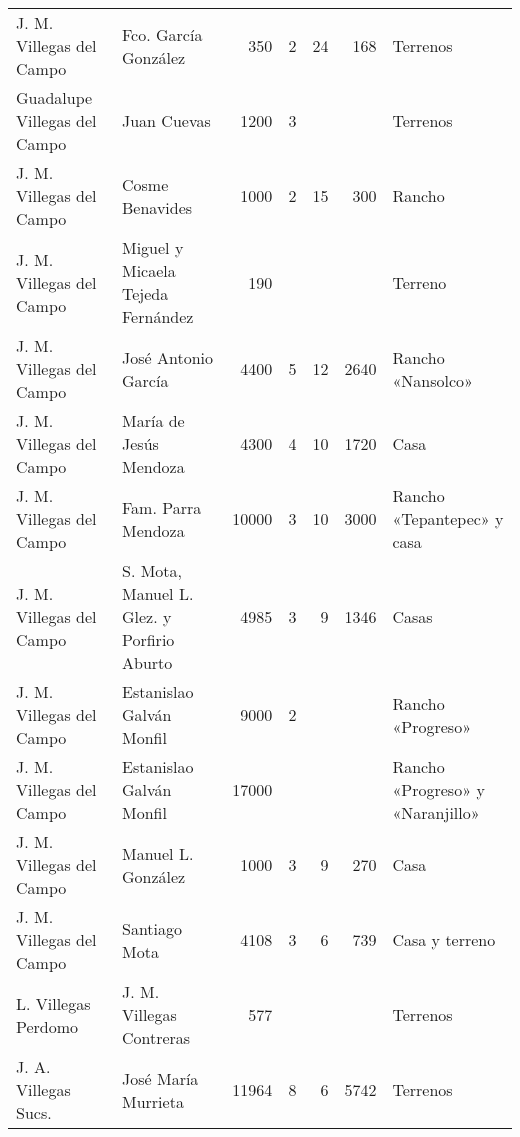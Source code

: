 \documentclass[14pt,twoside,final]{extbook} %
\begin{document}
{\begin{longtable}[c]{@{}p{2.5cm}lrSrrl@{}}
J. M. Villegas del Campo & Fco. García González & 350 & 2 & 24 & 168 & Terrenos \\
Guadalupe Villegas del Campo & Juan Cuevas & 1200 & 3 & {} & {} & Terrenos \\
J. M. Villegas del Campo & Cosme Benavides & 1000 & 2 & 15 & 300 & Rancho \\
J. M. Villegas del Campo & Miguel y Micaela Tejeda Fernández & 190 & {} & {} & {} & Terreno \\
J. M. Villegas del Campo & José Antonio García & 4400 & 5 & 12 & 2640 & Rancho «Nansolco» \\
J. M. Villegas del Campo & María de Jesús Mendoza & 4300 & 4 & 10 & 1720 & Casa \\
J. M. Villegas del Campo & Fam. Parra Mendoza & 10000 & 3 & 10 & 3000 & Rancho «Tepantepec» y casa \\
J. M. Villegas del Campo & S. Mota, Manuel L. Glez. y Porfirio Aburto & 4985 & 3 & 9 & 1346 & Casas \\
J. M. Villegas del Campo & Estanislao Galván Monfil & 9000 & 2 & {} & {} & Rancho «Progreso» \\
J. M. Villegas del Campo & Estanislao Galván Monfil & 17000 & {} & {} & {} & Rancho «Progreso» y «Naranjillo» \\
J. M. Villegas del Campo & Manuel L. González & 1000 & 3 & 9 & 270 & Casa \\
J. M. Villegas del Campo & Santiago Mota & 4108 & 3 & 6 & 739 & Casa y terreno \\
L. Villegas Perdomo & J. M. Villegas Contreras & 577 & {} & {} & {} & Terrenos \\
J. A. Villegas Sucs. & José María Murrieta & 11964 & 8 & 6 & 5742 & Terrenos \\

\end{longtable}}
\end{document}
